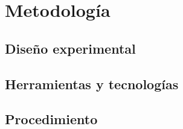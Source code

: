 \chapter{Metodología}


\section{Diseño experimental}

\section{Herramientas y tecnologías}

\section{Procedimiento}
